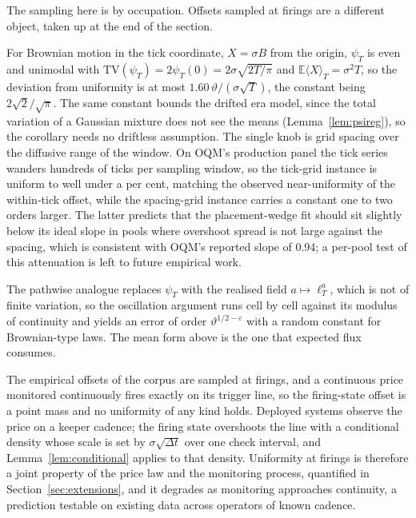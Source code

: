 \documentclass[11pt,a4paper]{article}
\theoremstyle{definition}
\theoremstyle{plain}
\theoremstyle{remark}
\begin{document}
The sampling here is by occupation. Offsets sampled at firings are a different object, taken up at the end of the section.

For Brownian motion in the tick coordinate, $X = \sigma B$ from the origin, $\psi_T$ is even and unimodal with $\mathrm{TV}(\psi_T) = 2\psi_T(0) = 2\sigma\sqrt{2T/\pi}$ and 
$\mathbb{E}\langle X\rangle_T = \sigma^2 T$, so the deviation from uniformity is at most $1.60\, \vartheta / (\sigma \sqrt T)$, the constant being $2\sqrt2/\sqrt\pi$. The same 
constant bounds the drifted era model, since the total variation of a Gaussian mixture does not see the means (Lemma~\ref{lem:psireg}), so the corollary needs no driftless assumption. 
The single knob is grid spacing over the diffusive range of the window. On OQM's production panel the tick series wanders hundreds of ticks per sampling window, so the tick-grid instance 
is uniform to well under a per cent, matching the observed near-uniformity of the within-tick offset, while the spacing-grid instance carries a constant one to two orders larger. 
The latter predicts that the placement-wedge fit should sit slightly below its ideal slope in pools where overshoot spread is not large against the spacing, which is consistent with 
OQM's reported slope of 0.94; a per-pool test of this attenuation is left to future empirical work.

The pathwise analogue replaces $\psi_T$ with the realised field $a \mapsto \ell_T^a$, which is not of finite variation, so the oscillation argument runs cell by cell against its 
modulus of continuity and yields an error of order $\vartheta^{1/2-\varepsilon}$ with a random constant for Brownian-type laws.\cite{revuzyor,trotter1958} The mean form above is the 
one that expected flux consumes.

The empirical offsets of the corpus are sampled at firings, and a continuous price monitored continuously fires exactly on its trigger line, so the firing-state offset is a 
point mass and no uniformity of any kind holds. Deployed systems observe the price on a keeper cadence; the firing state overshoots the line with a conditional density whose 
scale is set by $\sigma\sqrt{\Delta t}$ over one check interval, and Lemma~\ref{lem:conditional} applies to that density. Uniformity at firings is therefore a joint property of 
the price law and the monitoring process, quantified in Section~\ref{sec:extensions}, and it degrades as monitoring approaches continuity, a prediction testable on existing data 
across operators of known cadence.
\end{document}
